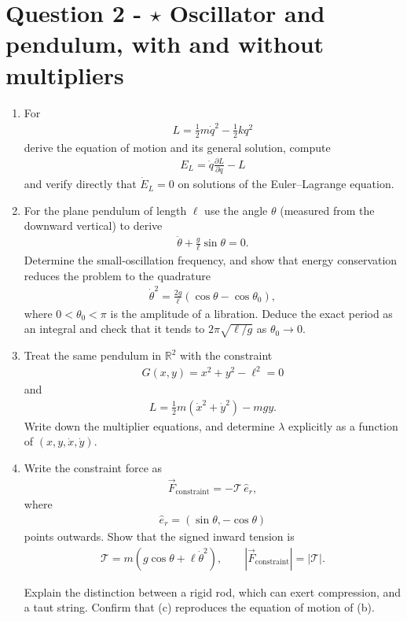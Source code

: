 \documentclass[12pt]{article}
\begin{document}
\section*{Question 2 - \(\star\) Oscillator and pendulum, with and without multipliers}
\begin{enumerate}
\item[(a)] For
\begin{align*}
L=\frac12 m\dot q^2-\frac12 kq^2
\end{align*}
derive the equation of motion and its general solution, compute
\begin{align*}
E_L
=
\dot q\frac{\partial L}{\partial\dot q}-L
\end{align*}
and verify directly that \(\dot E_L=0\) on solutions of the Euler--Lagrange
equation.

\item[(b)] For the plane pendulum of length \(\ell\) use the angle \(\theta\)
(measured from the downward vertical) to derive
\begin{align*}
\ddot\theta+\frac{g}{\ell}\sin\theta=0.
\end{align*}
Determine the small-oscillation frequency, and show that energy conservation
reduces the problem to the quadrature
\begin{align*}
\dot\theta^2
=
\frac{2g}{\ell}
\left(
\cos\theta-\cos\theta_0
\right),
\end{align*}
where \(0<\theta_0<\pi\) is the amplitude of a libration.
Deduce the exact period as an integral and check that it tends to
\(2\pi\sqrt{\ell/g}\) as \(\theta_0\to0\).

\item[(c)] Treat the same pendulum in \(\mathbb{R}^2\) with the constraint
\begin{align*}
G(x,y)=x^2+y^2-\ell^2=0
\end{align*}
and
\begin{align*}
L=\frac12 m(\dot x^2+\dot y^2)-mgy.
\end{align*}
Write down the multiplier equations, and determine \(\lambda\) explicitly
as a function of \((x,y,\dot x,\dot y)\).

\item[(d)] Write the constraint force as
\begin{align*}
\vec F_{\mathrm{constraint}}
=
-\mathcal{T}\,\hat e_r,
\end{align*}
where
\begin{align*}
\hat e_r=(\sin\theta,-\cos\theta)
\end{align*}
points outwards.
Show that the signed inward tension is
\begin{align*}
\mathcal{T}
=
m\left(g\cos\theta+\ell\dot\theta^2\right),
\qquad
\left|\vec F_{\mathrm{constraint}}\right|
=
|\mathcal{T}|.
\end{align*}

Explain the distinction between a rigid rod, which can exert compression,
and a taut string.
Confirm that (c) reproduces the equation of motion of (b).
\end{enumerate}
\end{document}
